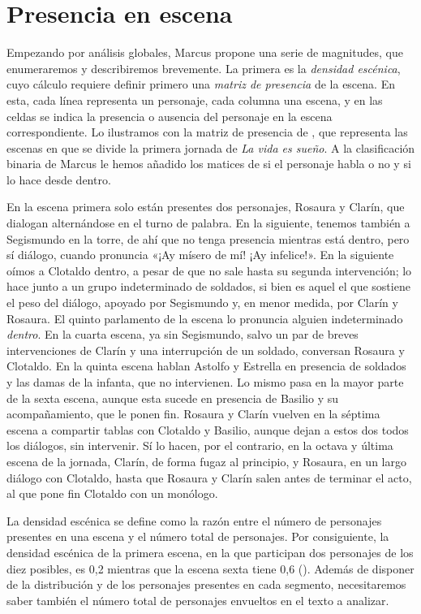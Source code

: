 \section*{Presencia en escena}
 Empezando por análisis globales, Marcus \parencite*[292-310]{marcus1973} propone una serie de magnitudes, que enumeraremos y describiremos brevemente. La primera es la \textit{densidad escénica}, cuyo cálculo requiere definir primero una \textit{matriz de presencia} de la escena. En esta, cada línea representa un personaje, cada columna una escena, y en las celdas se indica la presencia o ausencia del personaje en la escena correspondiente. Lo ilustramos con la matriz de presencia de , que representa las escenas en que se divide la primera jornada de \textit{La vida es sueño}. A la clasificación binaria de Marcus le hemos añadido los matices de si el personaje habla o no y si lo hace desde dentro.

En la escena primera solo están presentes dos personajes, Rosaura y Clarín, que dialogan alternándose en el turno de palabra. En la siguiente, tenemos también a Segismundo en la torre, de ahí que no tenga presencia mientras está dentro, pero sí diálogo, cuando pronuncia «¡Ay mísero de mí! ¡Ay infelice!». En la siguiente oímos a Clotaldo dentro, a pesar de que no sale hasta su segunda intervención; lo hace junto a un grupo indeterminado de soldados, si bien es aquel el que sostiene el peso del diálogo, apoyado por Segismundo y, en menor medida, por Clarín y Rosaura. El quinto parlamento de la escena lo pronuncia alguien indeterminado \textit{dentro}. En la cuarta escena, ya sin Segismundo, salvo un par de breves intervenciones de Clarín y una interrupción de un soldado, conversan Rosaura y Clotaldo. En la quinta escena hablan Astolfo y Estrella en presencia de soldados y las damas de la infanta, que no intervienen. Lo mismo pasa en la mayor parte de la sexta escena, aunque esta sucede en presencia de Basilio y su acompañamiento, que le ponen fin. Rosaura y Clarín vuelven en la séptima escena a compartir tablas con Clotaldo y Basilio, aunque dejan a estos dos todos los diálogos, sin intervenir. Sí lo hacen, por el contrario, en la octava y última escena de la jornada, Clarín, de forma fugaz al principio, y Rosaura, en un largo diálogo con Clotaldo, hasta que Rosaura y Clarín salen antes de terminar el acto, al que pone fin Clotaldo con un monólogo.

La densidad escénica se define como la razón entre el número de personajes presentes en una escena y el número total de personajes. Por consiguiente, la densidad escénica de la primera escena, en la que participan dos personajes de los diez posibles, es {0{,}2} mientras que la escena sexta tiene {0{,}6} (). Además de disponer de la distribución y de los personajes presentes en cada segmento, necesitaremos saber también el número total de personajes envueltos en el texto a analizar.

